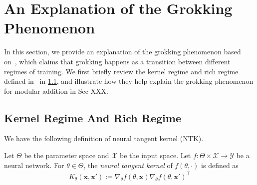 \section{An Explanation of the Grokking Phenomenon}
\label{sec:explanation}

In this section, we provide an explanation of the grokking phenomenon based on~\cite{KumarBGP24}, which claims that grokking happens as a transition between different regimes of training.
We first briefly review the kernel regime and rich regime defined in~\cite{KumarBGP24} in \cref{subsec:regimes}, and illustrate how they help explain the grokking phenomenon for modular addition in Sec XXX.

\subsection{Kernel Regime And Rich Regime}
\label{subsec:regimes}

We have the following definition of neural tangent kernel (NTK).

\begin{definition}
    Let $\Theta$ be the parameter space and $\mathcal{X}$ be the input space.
    Let $f \colon \Theta \times \mathcal{X} \to \mathcal{Y}$ be a neural network.
    For $\theta \in \Theta$, the \emph{neural tangent kernel} of $f(\theta, \cdot)$ is defined as 
    \begin{align*}
        K_\theta(\mathbf{x}, \mathbf{x}') := \nabla_\theta f(\theta, \mathbf{x}) \nabla_\theta f(\theta, \mathbf{x}')^\top
    \end{align*}
\end{definition}